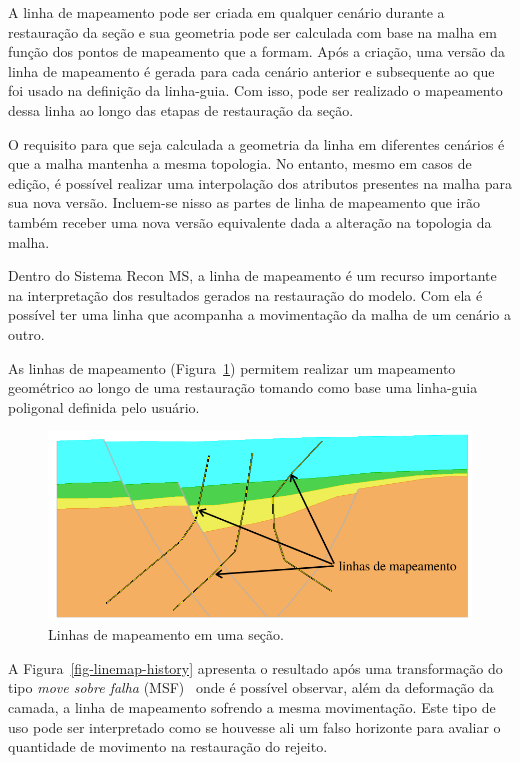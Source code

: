 A linha de mapeamento pode ser criada em qualquer cenário durante a restauração da seção e sua geometria pode ser calculada com base na malha em função dos pontos de mapeamento que a formam. Após a criação, uma versão da linha de mapeamento é gerada para cada cenário anterior e subsequente ao que foi usado na definição da linha-guia. Com isso, pode ser realizado o mapeamento dessa linha ao longo das etapas de restauração da seção.

O requisito para que seja calculada a geometria da linha em diferentes cenários é que a malha mantenha a mesma topologia. No entanto, mesmo em casos de edição, é possível realizar uma interpolação dos atributos presentes na malha para sua nova versão. Incluem-se nisso as partes de linha de mapeamento que irão também receber uma nova versão equivalente dada a alteração na topologia da malha.

Dentro do Sistema Recon MS, a linha de mapeamento é um recurso importante na interpretação dos resultados gerados na restauração do modelo. Com ela é possível ter uma linha que acompanha a movimentação da malha de um cenário a outro.

As linhas de mapeamento (Figura~\ref{fig-linemap}) permitem realizar um mapeamento geométrico ao longo de uma restauração tomando como base uma linha-guia poligonal definida pelo usuário.

\begin{figure} [h]
  \begin{center}
    \includegraphics[width=\textwidth]{images/fig-linhas-de-mapeamento-ed}
    \caption{Linhas de mapeamento em uma seção.}\label{fig-linemap}
  \end{center}
\end{figure}

A Figura~\ref{fig-linemap-history} apresenta o resultado após uma transformação do tipo \textit{move sobre falha} (MSF)~\cite{Recon} onde é possível observar, além da deformação da camada, a linha de mapeamento sofrendo a mesma movimentação. Este tipo de uso pode ser interpretado como se houvesse ali um falso horizonte para avaliar o quantidade de movimento na restauração do rejeito.

